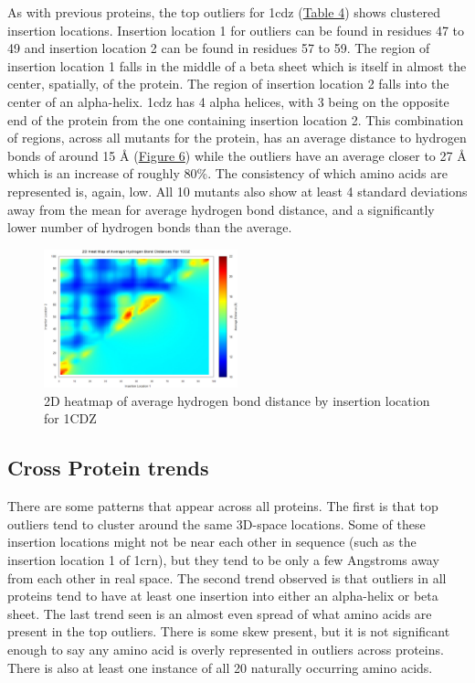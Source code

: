 \documentclass[sigconf, screen, authorversion, authoraddress=false, oneside]{acmart}
\begin{document}
As with previous proteins, the top outliers for 1cdz (\hyperref[table:4]{Table 4}) shows clustered insertion locations. Insertion location 1 for outliers can be found in residues 47 to 49 and insertion location 2 can be found in residues 57 to 59. The region of insertion location 1 falls in the middle of a beta sheet which is itself in almost the center, spatially, of the protein. The region of insertion location 2 falls into the center of an alpha-helix. 1cdz has 4 alpha helices, with 3 being on the opposite end of the protein from the one containing insertion location 2. This combination of regions, across all mutants for the protein, has an average distance to hydrogen bonds of around 15 Å (\hyperref[fig:Figure6]{Figure 6}) while the outliers have an average closer to 27 Å which is an increase of roughly 80\%. The consistency of which amino acids are represented is, again, low. All 10 mutants also show at least 4 standard deviations away from the mean for average hydrogen bond distance, and a significantly lower number of hydrogen bonds than the average.

\begin{figure}[ht]
    \centering
    \includegraphics[width=0.5\textwidth]{heatmap_1cdz_all_recrop.jpeg} 
    \caption{2D heatmap of average hydrogen bond distance by insertion location for 1CDZ}
    \label{fig:Figure6}
\end{figure}


\subsection{Cross Protein trends}
There are some patterns that appear across all proteins. The first is that top outliers tend to cluster around the same 3D-space locations. Some of these insertion locations might not be near each other in sequence (such as the insertion location 1 of 1crn), but they tend to be only a few Angstroms away from each other in real space. The second trend observed is that outliers in all proteins tend to have at least one insertion into either an alpha-helix or beta sheet. The last trend seen is an almost even spread of what amino acids are present in the top outliers. There is some skew present, but it is not significant enough to say any amino acid is overly represented in outliers across proteins. There is also at least one instance of all 20 naturally occurring amino acids.
\end{document}
